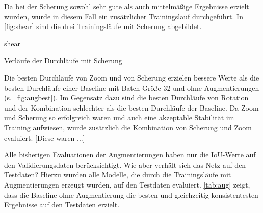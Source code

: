 Da bei der Scherung sowohl sehr gute als auch mittelmäßige Ergebnisse erzielt wurden, wurde in diesem Fall ein zusätzlicher Trainingslauf durchgeführt.
In \autoref{fig:shear} sind die drei Trainingsläufe mit Scherung abgebildet.

\begin{losses}{shear}
	\caption{Verläufe der Durchläufe mit Scherung}
	\label{fig:shear}
\end{losses}

Die besten Durchläufe von Zoom und von Scherung erzielen bessere Werte als die besten Durchläufe einer Baseline mit Batch-Größe 32 und ohne Augmentierungen (s.~\autoref{fig:augbest}).
Im Gegensatz dazu sind die besten Durchläufe von Rotation und der Kombination schlechter als die besten Durchläufe der Baseline.
Da Zoom und Scherung so erfolgreich waren und auch eine akzeptable Stabilität im Training aufwiesen, wurde zusätzlich die Kombination von Scherung und Zoom evaluiert.
[Diese waren ...]

Alle bisherigen Evaluationen der Augmentierungen haben nur die IoU-Werte auf den Validierungsdaten berücksichtigt.
Wie aber verhält sich das Netz auf den Testdaten?
Hierzu wurden alle Modelle, die durch die Trainingsläufe mit Augmentierungen erzeugt wurden, auf den Testdaten evaluiert.
\autoref{tab:aug} zeigt, dass die Baseline ohne Augmentierung die besten und gleichzeitig konsistentesten Ergebnisse auf den Testdaten erzielt.

